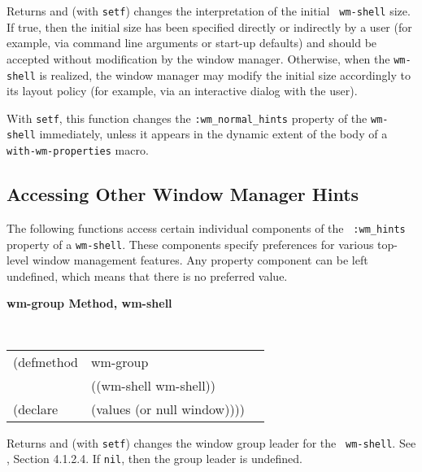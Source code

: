 \documentclass[twoside]{book}
\begin{document}
\begin{sloppy}
{\begin{flushright}
{}\end{flushright}}

\begin{flushright} \parbox[t]{6.125in}{
Returns and (with {\tt setf}) changes the interpretation of the initial {\tt
wm-shell} size. If true, then the initial size has been specified
directly or indirectly by a user (for example, via command line arguments or
start-up defaults) and should be accepted without modification by the window
manager. Otherwise, when the {\tt wm-shell} is realized, the window manager may
modify the initial size accordingly to its layout policy (for example, via
an interactive dialog with the user).

With {\tt setf}, this function changes the {\tt :wm\_normal\_hints} property of
the {\tt wm-shell} immediately, unless it appears in the dynamic extent of the
body of a {\tt with-wm-properties} macro.

}\end{flushright}

{\samepage
\subsection*{Accessing Other Window Manager Hints} 

The following functions access certain individual components of the {\tt
:wm\_hints} property of a {\tt wm-shell}. These components specify preferences
for various top-level window management features. Any property component
can be left undefined, which means that there is no preferred value.
}

{\samepage
{\large {\bf wm-group \hfill Method, wm-shell}}
\begin{flushright} \parbox[t]{6.125in}{
\tt
\begin{tabular}{lll}
\raggedright
(defmethod & wm-group & \\
           & ((wm-shell  wm-shell)) \\
(declare   & (values (or null window))))
\end{tabular}
\rm

}\end{flushright}}

\begin{flushright} \parbox[t]{6.125in}{
Returns and (with {\tt setf}) changes the window group leader for the {\tt
wm-shell}. See \cite{icccm}, Section 4.1.2.4. If {\tt nil}, then the group leader is
undefined. 

}
\end{flushright}
\end{sloppy}
\end{document}

